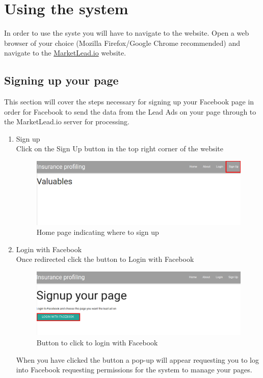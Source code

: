 \documentclass{article}
\begin{document}
	\section{Using the system}
		In order to use the syste you will have to navigate to the website.
		Open a web browser of your choice (Mozilla Firefox/Google Chrome recommended) and navigate to the \href{https://insuranceprofiling.herokuapp.com}{MarketLead.io} website.
		\subsection{Signing up your page}
			This section will cover the steps necessary for signing up your Facebook page in order for Facebook to send the data from the Lead Ads on your page through to the MarketLead.io server for processing.
			\begin{enumerate}
				\item Sign up\\
				Click on the Sign Up button in the top right corner of the website\\
				\begin{figure}[H]
				  \centering
				      \includegraphics[width=\textwidth]{images/home_signup.png}
				  \caption{Home page indicating where to sign up}
				  \label{fig:homeSignup}
				\end{figure}

				\item Login with Facebook\\
				Once redirected click the button to Login with Facebook\\
				\begin{figure}[H]
				  \centering
				      \includegraphics[width=\textwidth]{images/signup_login.png}
				  \caption{Button to click to login with Facebook}
				  \label{fig:signupLogin}
				\end{figure}
				When you have clicked the button a pop-up will appear requesting you to log into Facebook requesting permissions for the system to manage your pages.


\end{enumerate}
\end{document}
